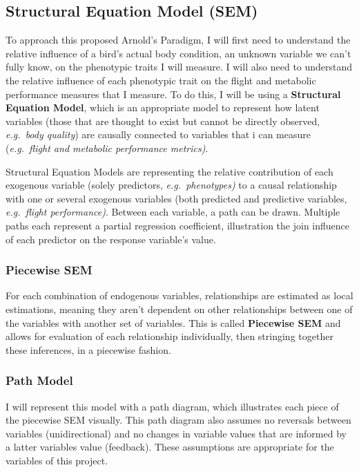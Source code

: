 \documentclass[
  letterpaper,
  DIV=11,
  numbers=noendperiod]{scrartcl}
\begin{document}
\hypertarget{structural-equation-model-sem}{%
\subsection{Structural Equation Model
(SEM)}\label{structural-equation-model-sem}}

To approach this proposed Arnold's Paradigm, I will first need to
understand the relative influence of a bird's actual body condition, an
unknown variable we can't fully know, on the phenotypic traits I will
measure. I will also need to understand the relative influence of each
phenotypic trait on the flight and metabolic performance measures that I
measure. To do this, I will be using a \textbf{Structural Equation
Model}, which is an appropriate model to represent how latent variables
(those that are thought to exist but cannot be directly observed,
\emph{e.g.~body quality}) are causally connected to variables that i can
measure (\emph{e.g.~flight and metabolic performance metrics)}.

Structural Equation Models are representing the relative contribution of
each exogenous variable (solely predictors, \emph{e.g.~phenotypes)} to a
causal relationship with one or several exogenous variables (both
predicted and predictive variables, \emph{e.g.~flight performance)}.
Between each variable, a path can be drawn. Multiple paths each
represent a partial regression coefficient, illustration the join
influence of each predictor on the response variable's value.

\hypertarget{piecewise-sem}{%
\subsubsection{Piecewise SEM}\label{piecewise-sem}}

For each combination of endogenous variables, relationships are
estimated as local estimations, meaning they aren't dependent on other
relationships between one of the variables with another set of
variables. This is called \textbf{Piecewise SEM} and allows for
evaluation of each relationship individually, then stringing together
these inferences, in a piecewise fashion.

\hypertarget{path-model}{%
\subsubsection{Path Model}\label{path-model}}

I will represent this model with a path diagram, which illustrates each
piece of the piecewise SEM visually. This path diagram also assumes no
reversals between variables (unidirectional) and no changes in variable
values that are informed by a latter variables value (feedback). These
assumptions are appropriate for the variables of this project.
\end{document}
